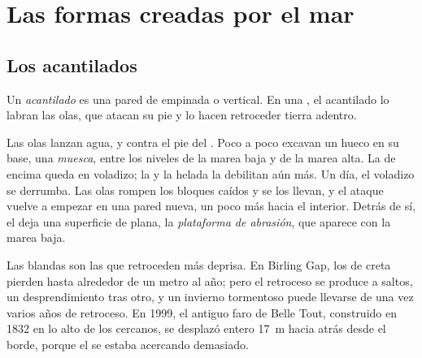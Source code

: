 \section{Las formas creadas por el mar}

\subsection{Los acantilados}

\begin{definition}[Acantilado]\label{def:g9:landforms:cliff}
Un \emph{acantilado} es una pared de  empinada o
vertical. En una , el acantilado lo labran las olas, que atacan su
pie y lo hacen retroceder tierra adentro.
\end{definition}

Las olas lanzan agua,  y  contra el pie del . Poco a
poco excavan un hueco en su base, una \emph{muesca}, entre los niveles de
la marea baja y de la marea alta. La  de encima queda en voladizo; la
 y la helada la debilitan aún más. Un día, el voladizo se derrumba.
Las olas rompen los bloques caídos y se los llevan, y el ataque vuelve a
empezar en una pared nueva, un poco más hacia el interior. Detrás de sí, el
 deja una superficie de  plana, la \emph{plataforma de
abrasión}, que aparece
con la marea baja.

Las  blandas son las que retroceden más deprisa. En Birling Gap, los
 de creta pierden hasta alrededor de un metro al año; pero el
retroceso se produce a saltos, un desprendimiento tras otro, y un invierno
tormentoso puede llevarse de una vez varios años de retroceso. En 1999, el
antiguo faro de Belle Tout, construido en 1832 en lo alto de los
 cercanos, se desplazó entero \qty{17}{m} hacia atrás desde el
borde, porque el  se estaba acercando demasiado.

